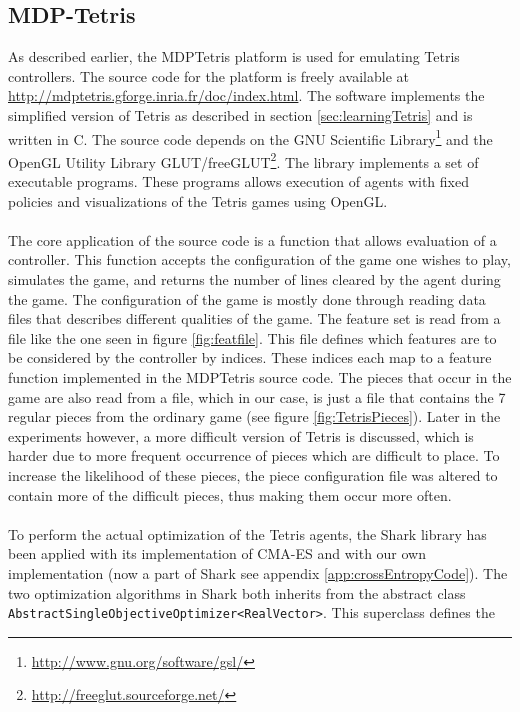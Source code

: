 \subsection{MDP-Tetris \label{sec:MDPTetris}}

As described earlier, the MDPTetris platform is used for emulating Tetris controllers. 
The source code for the 
platform is freely available at \url{http://mdptetris.gforge.inria.fr/doc/index.html}.
The software implements the simplified version of Tetris as described in 
section \ref{sec:learningTetris} and is written in C. The source code depends on
the GNU Scientific Library\footnote{\url{http://www.gnu.org/software/gsl/}} and
the OpenGL Utility 
Library GLUT/freeGLUT\footnote{\url{http://freeglut.sourceforge.net/}}.
The library implements a set of executable programs. These programs 
allows execution of agents with fixed policies and visualizations
of the Tetris games using OpenGL.\\
\\
The core application of the source code is a function that allows evaluation of 
a controller. This function accepts the configuration of the game one wishes to play,
simulates the game, and returns the number of lines cleared by the agent during the game.
The configuration of the game is mostly done through reading data files that describes 
different qualities of the game. The feature set is read from a file
like the one seen in figure \ref{fig:featfile}. This file defines which features are to be 
considered by the controller by indices. These indices each map to a feature function 
implemented in the MDPTetris source code. The pieces that occur in the game are also read from a file,
which in our case, is just a file that contains the 7 regular pieces from the ordinary game
(see figure \ref{fig:TetrisPieces}). Later in the experiments however, a more difficult version of Tetris
is discussed, which is harder due to more frequent occurrence of pieces which are difficult to place.
To increase the likelihood of these pieces, the piece configuration file was altered to
contain more of the difficult pieces, thus making them occur more often.\\
\\
To perform the actual optimization of the Tetris agents, the Shark library has been applied
with its implementation of CMA-ES and with our own implementation (now a part of Shark
see appendix \ref{app:crossEntropyCode}). The two optimization algorithms in Shark both 
inherits from the abstract class 
\texttt{\lstinline$AbstractSingleObjectiveOptimizer<RealVector>$}. This superclass defines the
